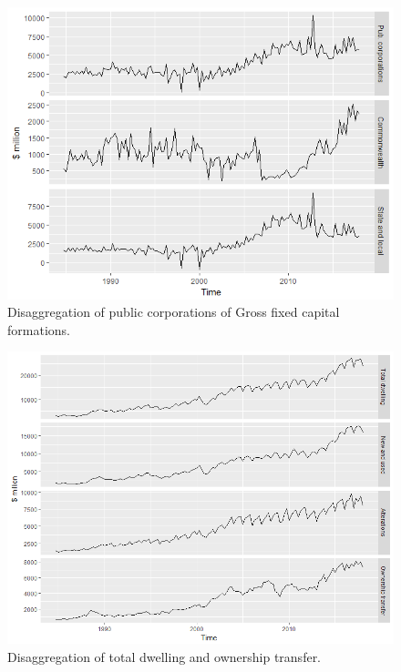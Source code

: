 \documentclass[graybox]{svmult}
\begin{document}
\begin{figure}[H]
	\centering
	\small
	\includegraphics[scale=0.65]{Figs/TS-plots/EXP-hierarchy/set-8.png}
	\caption{Disaggregation of public corporations of Gross fixed capital formations.}\label{EXP-set-8}
\end{figure}

\begin{figure}[H]
 	\centering
 	\small
 	\includegraphics[scale=0.5]{Figs/TS-plots/EXP-hierarchy/set-9.png}
 	\caption{Disaggregation of total dwelling and ownership transfer.}\label{EXP-set-9}
\end{figure}
\end{document}
